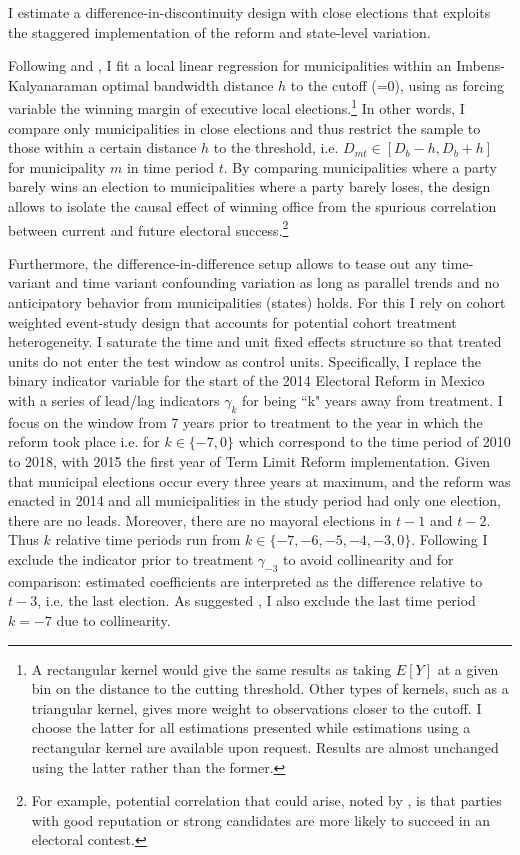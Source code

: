 \documentclass[12pt]{amsart}
\numberwithin{equation}{section}
\theoremstyle{definition}
\theoremstyle{definition}
\theoremstyle{definition}
\begin{document}
I estimate  a difference-in-discontinuity design with close elections that exploits the staggered implementation of the reform and state-level variation.
      
Following \citet{grembi_2016} and \citet{gelman_imbens2014}, I fit a local linear regression for municipalities within an Imbens-Kalyanaraman optimal bandwidth distance $h$ to the cutoff (=0), using as forcing variable the winning margin of executive local elections.\footnote{A rectangular kernel would give the same results as taking $E[Y]$ at a given bin on the distance to the cutting threshold. Other types of kernels, such as a triangular kernel, gives more weight to observations closer to the cutoff. I choose the latter for all estimations presented while estimations using a rectangular kernel are available upon request. Results are almost unchanged using the latter rather than the former.} In other words, I compare only municipalities in close elections and thus restrict the sample to those within a certain distance $h$ to the threshold, i.e. $D_{mt} \in [D_b-h, D_b+h]$ for municipality $m$ in time period $t$. By comparing municipalities where a party barely wins an election to municipalities where a party barely loses, the design allows to isolate the causal effect of winning office from the spurious correlation between current and future electoral success.\footnote{For example, potential correlation that could arise, noted by \citet{klasnja_titiunik_2017}, is that parties with good reputation or strong candidates are more likely to succeed in an electoral contest.} 

Furthermore, the difference-in-difference setup allows to tease out any time-variant and time variant confounding variation as long as parallel trends and no anticipatory behavior from municipalities (states) holds. For this I rely on \citet{abraham_sun_2020} cohort weighted event-study design that accounts for potential cohort treatment heterogeneity. I saturate the time and unit fixed effects structure so that treated units do not enter the test window as control units. Specifically, I replace the binary indicator variable for the start of the 2014 Electoral Reform in Mexico with a series of lead/lag indicators $\gamma_k$ for being ``k" years away from treatment. I focus on the window from 7 years prior to treatment to the year in which the reform took place i.e. for $k \in \{-7,0\} $ which correspond to the time period of 2010 to 2018, with 2015 the first year of Term Limit Reform implementation. Given that municipal elections occur every three years at maximum, and the reform was enacted in 2014 and all municipalities in the study period had only one election, there are no leads. Moreover, there are no mayoral elections in $t-1$ and $t-2$. Thus $k$ relative time periods run from  $k \in\{-7,-6,-5,-4,-3,0\}$. Following \citet{abraham_sun_2020} I exclude the indicator prior to treatment  $\gamma_{-3}$ to avoid collinearity and for comparison: estimated coefficients are interpreted as the difference relative to $t-3$, i.e. the last election. As suggested   \citet{abraham_sun_2020}, I also exclude the last time period $k=-7$ due to collinearity.
\end{document}
